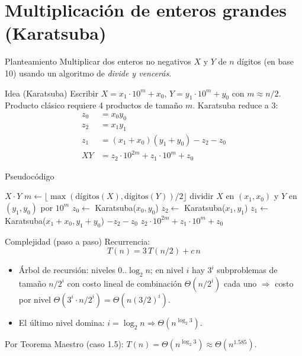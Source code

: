 \documentclass[aspectratio=169]{beamer}
\begin{document}
\section{Multiplicación de enteros grandes (Karatsuba)}
\begin{frame}{Planteamiento}
Multiplicar dos enteros no negativos $X$ y $Y$ de $n$ dígitos (en base 10) usando un algoritmo de \emph{divide y vencerás}.
\end{frame}

\begin{frame}{Idea (Karatsuba)}
Escribir $X = x_1\cdot 10^m + x_0$, $Y = y_1\cdot 10^m + y_0$ con $m \approx n/2$.\\
Producto clásico requiere 4 productos de tamaño $m$. Karatsuba reduce a 3:
\begin{align*}
z_0 &= x_0 y_0\\
z_2 &= x_1 y_1\\
z_1 &= (x_1{+}x_0)(y_1{+}y_0) - z_2 - z_0\\[0.5ex]
XY &= z_2\cdot 10^{2m} + z_1 \cdot 10^m + z_0
\end{align*}
\end{frame}

\begin{frame}{Pseudocódigo}
\begin{algorithm}[H]
\caption{Karatsuba($X, Y$)}
\begin{algorithmic}[1]
  \State \Return $X \cdot Y$
\EndIf
\State $m \gets \lfloor \max(\text{dígitos}(X), \text{dígitos}(Y))/2 \rfloor$
\State dividir $X$ en $(x_1, x_0)$ y $Y$ en $(y_1,y_0)$ por $10^m$
\State $z_0 \gets$ Karatsuba($x_0, y_0$)
\State $z_2 \gets$ Karatsuba($x_1, y_1$)
\State $z_1 \gets$ Karatsuba($x_1{+}x_0, y_1{+}y_0$) $- z_2 - z_0$
\State \Return $z_2\cdot 10^{2m} + z_1\cdot 10^m + z_0$
\end{algorithmic}
\end{algorithm}
\end{frame}

\begin{frame}{Complejidad (paso a paso)}
Recurrencia:
\[ T(n)=3\,T(n/2) + c\,n \]
\begin{itemize}
  \item Árbol de recursión: niveles $0.. \log_2 n$; en nivel $i$ hay $3^i$ subproblemas de tamaño $n/2^i$ con costo lineal de combinación $\Theta(n/2^i)$ cada uno $\Rightarrow$ costo por nivel $\Theta\!\left(3^i \cdot n/2^i\right)=\Theta(n(3/2)^i)$. 
  \item El último nivel domina: $i=\log_2 n \Rightarrow \Theta\!\left(n^{\log_2 3}\right)$.
\end{itemize}
Por Teorema Maestro (caso 1.5): $T(n)=\Theta\!\left(n^{\log_2 3}\right)\approx \Theta(n^{1.585})$.
\end{frame}
\end{document}

